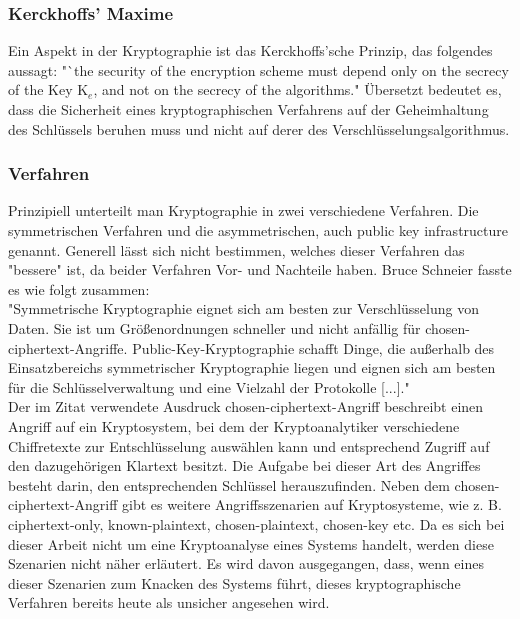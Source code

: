 \documentclass[10pt, a4paper,headsepline]{scrreprt}
\begin{document}
\subsubsection{Kerckhoffs' Maxime}
Ein Aspekt in der Kryptographie ist das Kerckhoffs'sche Prinzip, das folgendes aussagt: "`the security of the encryption scheme must depend only on the secrecy of the Key K$_{e}$, and not on the secrecy of the algorithms." \citep[S. 23]{book:practical-crypto} Übersetzt bedeutet es, dass die Sicherheit eines kryptographischen Verfahrens  auf der Geheimhaltung des Schlüssels beruhen muss und nicht auf derer des Verschlüsselungsalgorithmus.


\subsubsection{Verfahren}
Prinzipiell unterteilt man Kryptographie in zwei verschiedene Verfahren. Die symmetrischen Verfahren und die asymmetrischen, auch public key infrastructure genannt. Generell lässt sich nicht bestimmen, welches dieser Verfahren das "bessere" ist, da beider Verfahren Vor- und Nachteile haben. Bruce Schneier fasste es wie folgt zusammen: \\
"Symmetrische Kryptographie eignet sich am besten zur Verschlüsselung von Daten. Sie ist um Größenordnungen schneller und nicht anfällig für chosen-ciphertext-Angriffe. Public-Key-Kryptographie schafft Dinge, die außerhalb des Einsatzbereichs symmetrischer Kryptographie liegen und eignen sich am besten für die Schlüsselverwaltung und eine Vielzahl der Protokolle [...]." \citep[S. 254f]{book:angewandte-krypto} \\ 
Der im Zitat verwendete Ausdruck chosen-ciphertext-Angriff beschreibt einen Angriff auf ein Kryptosystem, bei dem der Kryptoanalytiker verschiedene Chiffretexte zur Entschlüsselung auswählen kann und entsprechend Zugriff auf den dazugehörigen Klartext besitzt. Die Aufgabe bei dieser Art des Angriffes besteht darin, den entsprechenden Schlüssel herauszufinden. \citep[S. 7]{book:angewandte-krypto}
Neben dem chosen-ciphertext-Angriff gibt es weitere Angriffsszenarien auf Kryptosysteme, wie z. B. ciphertext-only, known-plaintext, chosen-plaintext, chosen-key etc. Da es sich bei dieser Arbeit nicht um eine Kryptoanalyse eines Systems handelt, werden diese Szenarien nicht näher erläutert. Es wird davon ausgegangen, dass, wenn eines dieser Szenarien zum Knacken des Systems führt, dieses kryptographische Verfahren bereits heute als unsicher angesehen wird.
\end{document}
